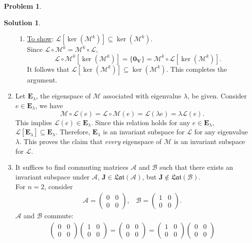 \documentclass{article}
\theoremstyle{definition}
\newtheorem*{prob*}{Problem}
\newtheorem*{sln*}{Solution}
\newcommand{\V}{\mathbf{V}}
\newcommand{\lag}{\mathcal{L}}
\newcommand{\J}{\mathbf{J}}
\newcommand{\M}{\mathcal{M}}
\begin{document}
\begin{prob*}
\begin{sln*}
\begin{enumerate}
\begin{enumerate}
				\item \underline{To show}: $\lag[\ker(\M^k)] \subseteq \ker(\M^k)$. \\
				
				Since $\lag\circ \M^k = \M^k \circ \lag$, $$\lag\circ \M^k[\ker(\M^k)] = \{\mathbf{0}_\V\} = \M^k \circ \lag[\ker(\M^k)].$$ It follows that $\lag[\ker(\M^k)] \subseteq \ker(\M^k)$. This completes the argument.\\
			\end{enumerate}
			
			
			\item Let $\mathbf{E}_\lambda$, the eigenspace of $\M$ associated with eigenvalue $\lambda$, be given. Consider $e \in \mathbf{E}_\lambda$, we have $$\M\circ \lag(e) = \lag \circ \M(e) = \lag(\lambda e) = \lambda \lag(e).$$ This implies $\lag(e) \in \mathbf{E}_\lambda$. Since this relation holds for any $e\in \mathbf{E}_\lambda$, $\lag[\mathbf{E}_\lambda] \subseteq \mathbf{E}_\lambda$. Therefore, $\mathbf{E}_\lambda$ is an invariant subspace for $\lag$ for any eigenvalue $\lambda$. This proves the claim that \textit{every} eigenspace of $\M$ is an invariant subspace for $\lag$.\\
			
			
			\item It suffices to find commuting matrices $\mathcal{A}$ and $\mathcal{B}$ such that there exists an invariant subspace under $\mathcal{A}$, $\J \in \mathfrak{Lat}(\mathcal{A})$, but $\J \notin \mathfrak{Lat}(\mathcal{B})$. \\
			
			For $n=2$, consider
			\begin{align*}
			\mathcal{A} = \begin{pmatrix}
			0&0\\
			0&0
			\end{pmatrix},\,\,\,\,\,
			\mathcal{B} = \begin{pmatrix}
			1&0\\
			0&0
			\end{pmatrix}.
			\end{align*} 
			$\mathcal{A}$ and $\mathcal{B}$ commute:
			\begin{align*}
			\begin{pmatrix}
			0&0\\
			0&0
			\end{pmatrix}\begin{pmatrix}
			1&0\\
			0&0
			\end{pmatrix}=
			\begin{pmatrix}
			0&0\\
			0&0
			\end{pmatrix}
			=
			\begin{pmatrix}
			1&0\\
			0&0
			\end{pmatrix}
			\begin{pmatrix}
			0&0\\
			0&0
			\end{pmatrix}
			\end{align*}
			

\end{enumerate}
\end{sln*}
\end{prob*}
\end{document}
